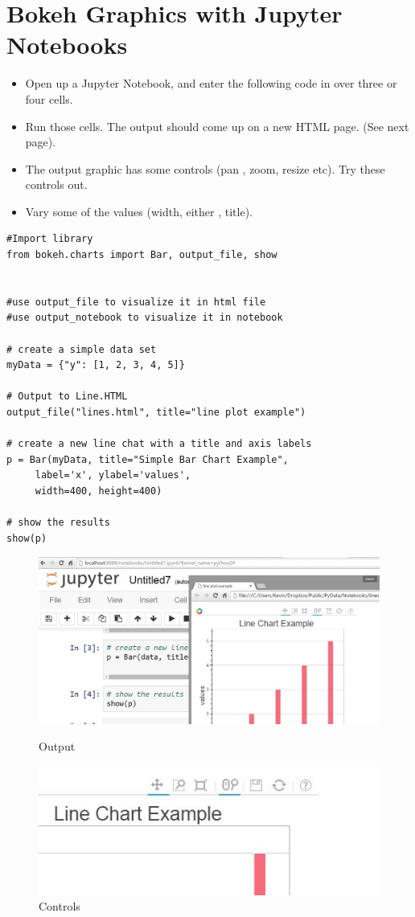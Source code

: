 \documentclass[a4paper,12pt]{article}
\begin{document}
	\large
\section*{Bokeh Graphics with Jupyter Notebooks}
\begin{itemize}
\item Open up a Jupyter Notebook, and enter the following code in over three or four cells.
\item Run those cells. The output should come up on a new HTML page. (See next page).
\item The output graphic has some controls (pan , zoom, resize etc). Try these controls out.
\item Vary some of the values (width, either , title).
\end{itemize}
\begin{framed}
\begin{verbatim}
#Import library
from bokeh.charts import Bar, output_file, show 


#use output_file to visualize it in html file
#use output_notebook to visualize it in notebook

# create a simple data set
myData = {"y": [1, 2, 3, 4, 5]}

# Output to Line.HTML
output_file("lines.html", title="line plot example") 

# create a new line chat with a title and axis labels
p = Bar(myData, title="Simple Bar Chart Example",
     label='x', ylabel='values', 
     width=400, height=400)

# show the results
show(p)

\end{verbatim}
\end{framed}
\newpage
\begin{figure}[h!]
\centering
\includegraphics[width=0.9\linewidth]{images/OutPut}
\caption{Output}\vspace{0.5cm}
\includegraphics[width=0.8\linewidth]{images/TopRightCorner}
\caption{Controls}
\end{figure}
\end{document}
